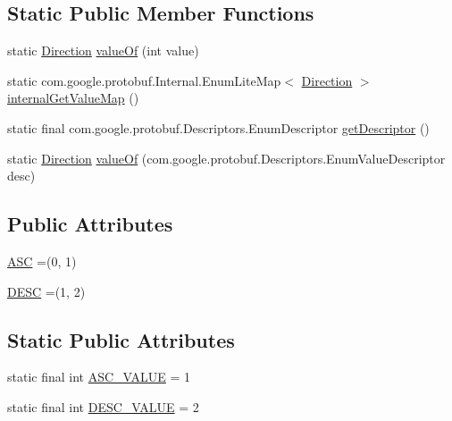 \subsection*{Static Public Member Functions}
\begin{DoxyCompactItemize}
\item 
static \mbox{\hyperlink{enumcom_1_1mysql_1_1cj_1_1x_1_1protobuf_1_1_mysqlx_crud_1_1_order_1_1_direction}{Direction}} \mbox{\hyperlink{enumcom_1_1mysql_1_1cj_1_1x_1_1protobuf_1_1_mysqlx_crud_1_1_order_1_1_direction_a65c32945b57b0f931479501744b4ad76}{value\+Of}} (int value)
\item 
static com.\+google.\+protobuf.\+Internal.\+Enum\+Lite\+Map$<$ \mbox{\hyperlink{enumcom_1_1mysql_1_1cj_1_1x_1_1protobuf_1_1_mysqlx_crud_1_1_order_1_1_direction}{Direction}} $>$ \mbox{\hyperlink{enumcom_1_1mysql_1_1cj_1_1x_1_1protobuf_1_1_mysqlx_crud_1_1_order_1_1_direction_ada97f61be0d5e53f8ee9250733289a01}{internal\+Get\+Value\+Map}} ()
\item 
static final com.\+google.\+protobuf.\+Descriptors.\+Enum\+Descriptor \mbox{\hyperlink{enumcom_1_1mysql_1_1cj_1_1x_1_1protobuf_1_1_mysqlx_crud_1_1_order_1_1_direction_ab5a925a3ee57b48e33c3d28bf1f21d95}{get\+Descriptor}} ()
\item 
static \mbox{\hyperlink{enumcom_1_1mysql_1_1cj_1_1x_1_1protobuf_1_1_mysqlx_crud_1_1_order_1_1_direction}{Direction}} \mbox{\hyperlink{enumcom_1_1mysql_1_1cj_1_1x_1_1protobuf_1_1_mysqlx_crud_1_1_order_1_1_direction_a677de3acc339860e4408c83a51c5919a}{value\+Of}} (com.\+google.\+protobuf.\+Descriptors.\+Enum\+Value\+Descriptor desc)
\end{DoxyCompactItemize}
\subsection*{Public Attributes}
\begin{DoxyCompactItemize}
\item 
\mbox{\hyperlink{enumcom_1_1mysql_1_1cj_1_1x_1_1protobuf_1_1_mysqlx_crud_1_1_order_1_1_direction_a4123976abc9cd988f3437449872a9e61}{A\+SC}} =(0, 1)
\item 
\mbox{\hyperlink{enumcom_1_1mysql_1_1cj_1_1x_1_1protobuf_1_1_mysqlx_crud_1_1_order_1_1_direction_af668de228499341dacde4a5a91d7e3c6}{D\+E\+SC}} =(1, 2)
\end{DoxyCompactItemize}
\subsection*{Static Public Attributes}
\begin{DoxyCompactItemize}
\item 
static final int \mbox{\hyperlink{enumcom_1_1mysql_1_1cj_1_1x_1_1protobuf_1_1_mysqlx_crud_1_1_order_1_1_direction_a46382cae60df69bd4600b908f90d0154}{A\+S\+C\+\_\+\+V\+A\+L\+UE}} = 1
\item 
static final int \mbox{\hyperlink{enumcom_1_1mysql_1_1cj_1_1x_1_1protobuf_1_1_mysqlx_crud_1_1_order_1_1_direction_ae4278de8ce336611b85afee30225b420}{D\+E\+S\+C\+\_\+\+V\+A\+L\+UE}} = 2
\end{DoxyCompactItemize}



